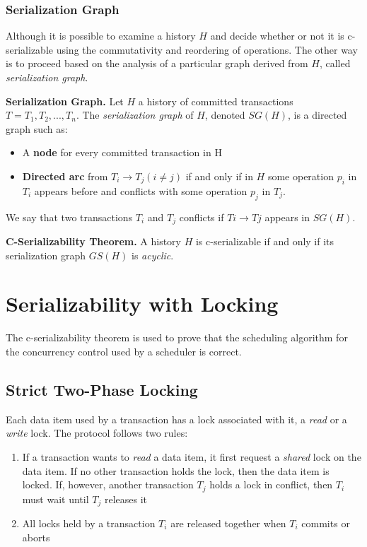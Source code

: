 \subsubsection{Serialization Graph}
Although it is possible to examine a history $H$ and decide whether or not it is c-serializable using the commutativity and reordering of operations. The other way is to proceed based on the analysis of a particular graph derived from $H$, called \textit{serialization graph}.
\begin{tcolorbox}
\textbf{Serialization Graph.} Let $H$ a history of committed transactions $T = {T_1, T_2,...,T_n}$. The \textit{serialization graph} of $H$, denoted $SG(H)$, is a directed graph such as:
\begin{itemize}
    \item A \textbf{node} for every committed transaction in H
    \item \textbf{Directed arc} from $T_i \rightarrow T_j (i \neq j)$ if and only if in $H$ some operation $p_i$ in $T_i$ appears before and conflicts with some operation $p_j$ in $T_j$.
\end{itemize}
\end{tcolorbox}
We say that two transactions $T_i$ and $T_j$ conflicts if $Ti \rightarrow Tj$ appears in $SG(H)$.
\begin{tcolorbox}
\textbf{C-Serializability Theorem.} A history $H$ is c-serializable if and only if its serialization graph $GS(H)$ is \textit{acyclic}.
\end{tcolorbox}

\section{Serializability with Locking}
The c-serializability theorem is used to prove that the scheduling algorithm for the concurrency control used by a scheduler is correct.

\subsection{Strict Two-Phase Locking}
Each data item used by a transaction has a lock associated with it, a \textit{read} or a \textit{write} lock. The protocol follows two rules:
\begin{enumerate}
    \item If a transaction wants to \textit{read} a data item, it first request a \textit{shared} lock on the data item. If no other transaction holds the lock, then the data item is locked. If, however, another transaction $T_j$ holds a lock in conflict, then $T_i$ must wait until $T_j$ releases it
    \item All locks held by a transaction $T_i$ are released together when $T_i$ commits or aborts
\end{enumerate}

